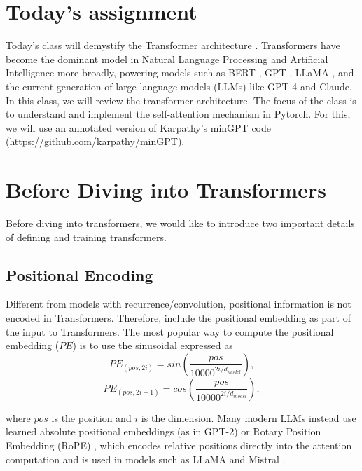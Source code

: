 \section{Today's assignment}
Today's class will demystify the Transformer architecture \cite{vaswani2017attention}. Transformers have become the dominant model in Natural Language Processing and Artificial Intelligence more broadly, powering models such as BERT \cite{devlin2018bert}, GPT \cite{brown2020language}, LLaMA \cite{touvron2023llama}, and the current generation of large language models (LLMs) like GPT-4 \citep{gpt-4} and Claude. In this class, we will review the transformer architecture. The focus of the class is to understand and implement the self-attention mechanism in Pytorch. For this, we will use an annotated version of Karpathy's minGPT code (\url{https://github.com/karpathy/minGPT}).


\section{Before Diving into Transformers}
Before diving into transformers, we would like to introduce two important details of defining and training transformers.


\subsection{Positional Encoding}
Different from models with recurrence/convolution, positional information is not encoded in Transformers. Therefore, \citet{vaswani2017attention} include the positional embedding as part of the input to Transformers. The most popular way to compute the positional embedding ($PE$) is to use the sinusoidal expressed as
\begin{equation}
        PE_{(pos,2i)} = sin(\frac{pos}{ 10000^{2i/d_{model}}}),
\end{equation}
\begin{equation}
    PE_{(pos,2i+1)} = cos(\frac{pos}{ 10000^{2i/d_{model}}}),
\end{equation}

\noindent where $pos$ is the position and $i$ is the dimension. Many modern LLMs instead use learned absolute positional embeddings (as in GPT-2) or Rotary Position Embedding (RoPE) \citep{su2024roformer}, which encodes relative positions directly into the attention computation and is used in models such as LLaMA \citep{touvron2023llama} and Mistral \citep{jiang2023mistral}.

